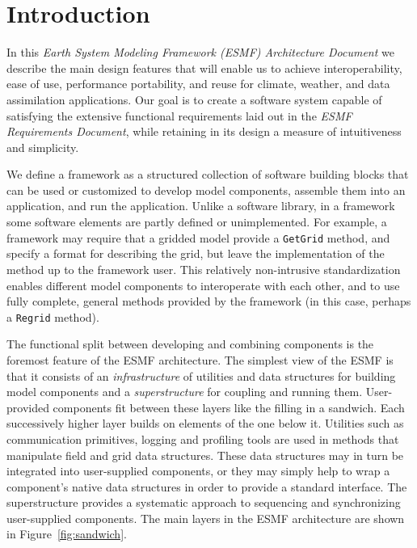 \section{Introduction}
\label{sec:intro}

In this {\it Earth System Modeling Framework (ESMF) Architecture Document} we describe 
the main design features that will enable us to achieve interoperability, ease of 
use, performance portability, and reuse for climate, weather, and data assimilation
applications.  Our goal is to create a software system capable of satisfying
the extensive functional requirements laid out in the {\it ESMF 
Requirements Document}, while retaining in its design a measure of intuitiveness
and simplicity. 

We define a framework as a structured collection of software building blocks 
that can be used or customized to develop model components, assemble them into an 
application, and run the application.  Unlike a software library, in a framework some
software elements are partly defined or unimplemented.  For example, a framework
may require that a gridded model provide a {\tt GetGrid} method, and specify 
a format for describing the grid, but leave the implementation of the method up
to the framework user.  This relatively non-intrusive standardization enables 
different model components to interoperate with each other, and to use fully
complete, general methods provided by the framework (in this case, perhaps a 
{\tt Regrid} method).

The functional split between developing and combining components is the
foremost feature of the ESMF architecture.  The simplest view of the ESMF 
is that it consists of an {\it infrastructure} of utilities and data 
structures for building model components and a {\it superstructure} for coupling 
and running them.  User-provided components fit between these 
layers like the filling in a sandwich.  Each successively higher layer builds
on elements of the one below it.  Utilities such as communication
primitives, logging and profiling tools are used in methods that
manipulate field and grid data structures.  These data structures may in 
turn be integrated into user-supplied components, or they may simply 
help to wrap a component's native data structures in order to provide 
a standard interface.  The superstructure provides a systematic approach to 
sequencing and synchronizing user-supplied components.  The main layers
in the ESMF architecture are shown in Figure~\ref{fig:sandwich}.  

